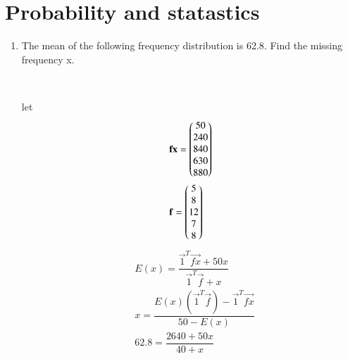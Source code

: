 \documentclass[journal,12pt,twocolumn]{IEEEtran}
\renewcommand\thesection{\arabic{section}}
\begin{document}
\section{Probability and statastics}
\renewcommand{\theequation}{\theenumi}
\begin{enumerate}[label=\thesection.\arabic*.,ref=\thesection.\theenumi]
\item The mean of the following frequency distribution is 62.8. Find the missing frequency x.
\\
\begin{table}[ht]
 \centering
 \caption{}
 \end{table}
 \solution\\
 \begin{table}[ht]
 \centering
 \caption{}
 \end{table}
 let
 \begin{align}
 &\mathbf{fx} = \begin{pmatrix}50\\240\\840\\630\\880\end{pmatrix}\\
 &\mathbf{f} = \begin{pmatrix}5\\8\\12\\7\\8\end{pmatrix} 
 \end{align}
 \begin{align}
 &E(x) = \dfrac{\vec{1}^T\vec{fx}+50x}{\vec{1}^T\vec{f}+x}\\
 & x =\dfrac{E(x)(\vec{1}^T\vec{f})-\vec{1}^T\vec{fx}}{50-E(x)}\\
 &62.8 = \dfrac{2640+50x}{40+x}\\

\end{align}
\end{enumerate}
\end{document}
